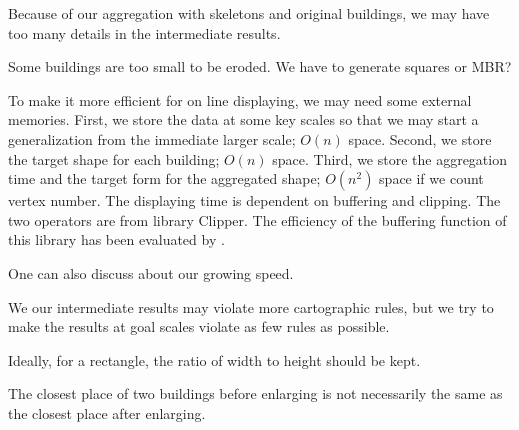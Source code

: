 \documentclass[graybox]{svmult}
\begin{document}
Because of our aggregation with skeletons and original 
buildings, we may have too many details in the intermediate 
results.

Some buildings are too small to be eroded. We have to generate 
squares or MBR?

To make it more efficient for on line displaying, we may need 
some external memories. First, we store the data at some key 
scales so that we may start a generalization from the immediate 
larger scale; $O(n)$ space. Second, we store the target shape 
for each building; $O(n)$ space. Third, we store the aggregation 
time and the target form for the aggregated shape; $O(n^2)$ 
space if we count vertex number.
%
The displaying time is dependent on buffering and clipping. The 
two operators are from library Clipper. The efficiency of the 
buffering function of this library has been evaluated by 
\textcite{Palfrader2015}.

One can also discuss about our growing speed.

We our intermediate results may violate more cartographic rules, but we try to 
make the results at goal scales violate as few rules as possible.

Ideally, for a rectangle, the ratio of width to height should be kept.

The closest place of two buildings before enlarging is not necessarily the same 
as the closest place after enlarging. 


\printbibliography
%
%
\end{document}
